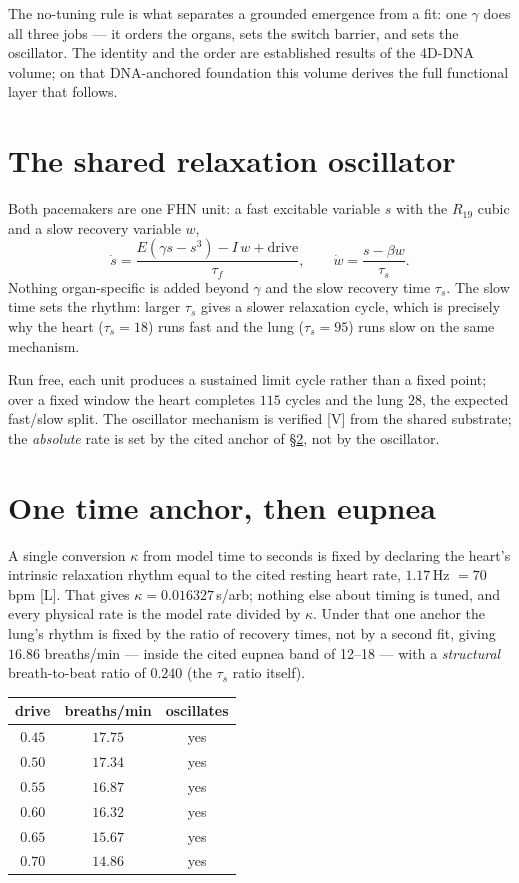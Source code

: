 \documentclass[11pt]{article}
\newcommand{\grade}[1]{\textsf{\small[#1]}}
\begin{document}
The no-tuning rule is what separates a grounded emergence from a fit: one $\gamma$ does all three jobs
--- it orders the organs, sets the switch barrier, and sets the oscillator. The identity and the order
are established results of the 4D-DNA volume; on that DNA-anchored foundation this volume derives the
full functional layer that follows.

\section{The shared relaxation oscillator}\label{sec:osc}

Both pacemakers are one FHN unit: a fast excitable variable $s$ with the $R_{19}$ cubic and a slow
recovery variable $w$,
\begin{equation}
\dot s = \frac{E(\gamma s - s^3) - I\,w + \text{drive}}{\tau_f},
\qquad
\dot w = \frac{s - \beta w}{\tau_s}.
\end{equation}
Nothing organ-specific is added beyond $\gamma$ and the slow recovery time $\tau_s$. The slow time sets
the rhythm: larger $\tau_s$ gives a slower relaxation cycle, which is precisely why the heart
($\tau_s=18$) runs fast and the lung ($\tau_s=95$) runs slow on the same mechanism.

Run free, each unit produces a sustained limit cycle rather than a fixed point; over a fixed window the
heart completes $115$ cycles and the lung $28$, the expected fast/slow split. The oscillator mechanism
is verified \grade{V} from the shared substrate; the \emph{absolute} rate is set by the cited anchor of
\S\ref{sec:anchor}, not by the oscillator.

\section{One time anchor, then eupnea}\label{sec:anchor}

A single conversion $\kappa$ from model time to seconds is fixed by declaring the heart's intrinsic
relaxation rhythm equal to the cited resting heart rate, $1.17\,$Hz $=70\,$bpm \grade{L}. That gives
$\kappa=0.016327\,$s/arb; nothing else about timing is tuned, and every physical rate is the model rate
divided by $\kappa$. Under that one anchor the lung's rhythm is fixed by the ratio of recovery times,
not by a second fit, giving $16.86$ breaths/min --- inside the cited eupnea band of 12--18 --- with a
\emph{structural} breath-to-beat ratio of $0.240$ (the $\tau_s$ ratio itself).

\begin{center}
\begin{tabular}{@{}ccc@{}}
\toprule
drive & breaths/min & oscillates\\
\midrule
$0.45$ & $17.75$ & yes\\
$0.50$ & $17.34$ & yes\\
$0.55$ & $16.87$ & yes\\
$0.60$ & $16.32$ & yes\\
$0.65$ & $15.67$ & yes\\
$0.70$ & $14.86$ & yes\\
\bottomrule
\end{tabular}
\end{center}
\end{document}

